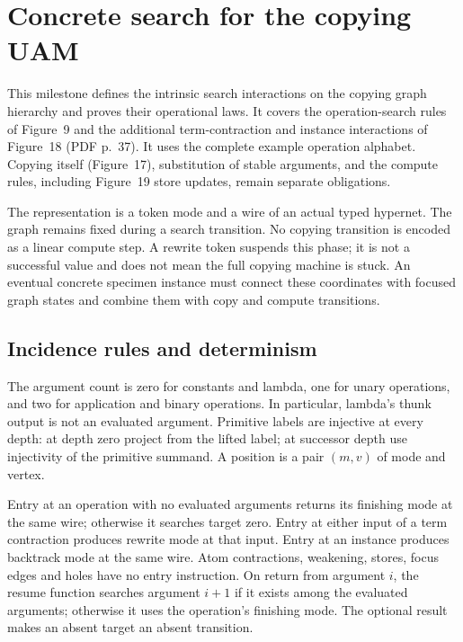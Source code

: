 \clearpage
\section{Concrete search for the copying UAM}
\label{sec:copying-search-phase}
This milestone defines the intrinsic search interactions on the copying graph
hierarchy and proves their operational laws. It covers the operation-search
rules of Figure~9 and the additional term-contraction and instance interactions
of Figure~18 (PDF p.~37). It uses the complete example operation alphabet.
Copying itself (Figure~17), substitution of stable arguments, and the compute
rules, including Figure~19 store updates, remain separate obligations.

The representation is a token mode and a wire of an actual typed hypernet.
The graph remains fixed during a search transition. No copying transition is
encoded as a linear compute step. A rewrite token suspends this phase; it is
not a successful value and does not mean the full copying machine is stuck.
An eventual concrete specimen instance must connect these coordinates with
focused graph states and combine them with copy and compute transitions.

\subsection{Incidence rules and determinism}

The argument count is zero for constants and lambda, one for unary operations,
and two for application and binary operations. In particular, lambda's thunk
output is not an evaluated argument. Primitive labels are injective at every
depth: at depth zero project from the lifted label; at successor depth use
injectivity of the primitive summand. A position is a pair $(m,v)$ of mode and
vertex.




Entry at an operation with no evaluated arguments returns its finishing
mode at the same wire; otherwise it searches target zero. Entry at either
input of a term contraction produces rewrite mode at that input. Entry at an
instance produces backtrack mode at the same wire. Atom contractions, weakening,
stores, focus edges and holes have no entry instruction. On return from
argument $i$, the resume function searches argument $i+1$ if it exists among
the evaluated arguments; otherwise it uses the operation's finishing mode.
The optional result makes an absent target an absent transition.

